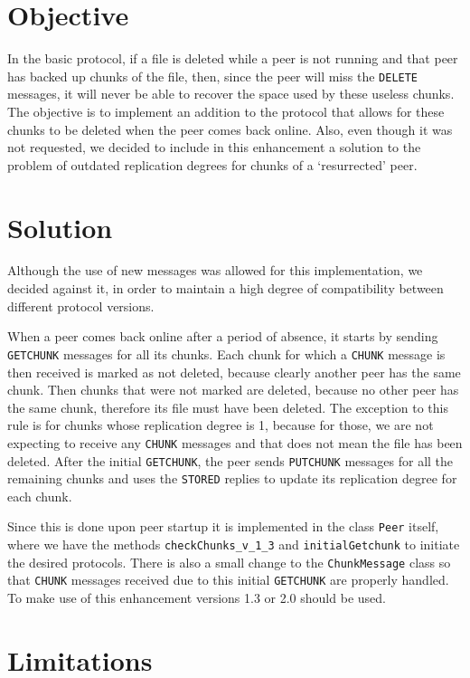 \documentclass[11pt,a4paper,reqno]{report}
\numberwithin{equation}{section}
\begin{document}
\section{Objective}

In the basic protocol, if a file is deleted while a peer is not running and that peer has backed up chunks of the file, then, since the peer will miss the \verb!DELETE! messages, it will never be able to recover the space used by these useless chunks. The objective is to implement an addition to the protocol that allows for these chunks to be deleted when the peer comes back online. Also, even though it was not requested, we decided to include in this enhancement a solution to the problem of outdated replication degrees for chunks of a `resurrected' peer.

\section{Solution}

Although the use of new messages was allowed for this implementation, we decided against it, in order to maintain a high degree of compatibility between different protocol versions. 

When a peer comes back online after a period of absence, it starts by sending \verb!GETCHUNK! messages for all its chunks. Each chunk for which a \verb!CHUNK! message is then received is marked as not deleted, because clearly another peer has the same chunk. Then chunks that were not marked are deleted, because no other peer has the same chunk, therefore its file must have been deleted. The exception to this rule is for chunks whose replication degree is 1, because for those, we are not expecting to receive any \verb!CHUNK! messages and that does not mean the file has been deleted. After the initial \verb!GETCHUNK!, the peer sends \verb!PUTCHUNK! messages for all the remaining chunks and uses the \verb!STORED! replies to update its replication degree for each chunk.

Since this is done upon peer startup it is implemented in the class \verb!Peer! itself, where we have the methods \verb!checkChunks_v_1_3! and \verb!initialGetchunk! to initiate the desired protocols. There is also a small change to the \verb!ChunkMessage! class so that \verb!CHUNK! messages received due to this initial \verb!GETCHUNK! are properly handled. To make use of this enhancement versions 1.3 or 2.0 should be used.

\section{Limitations}
\end{document}
